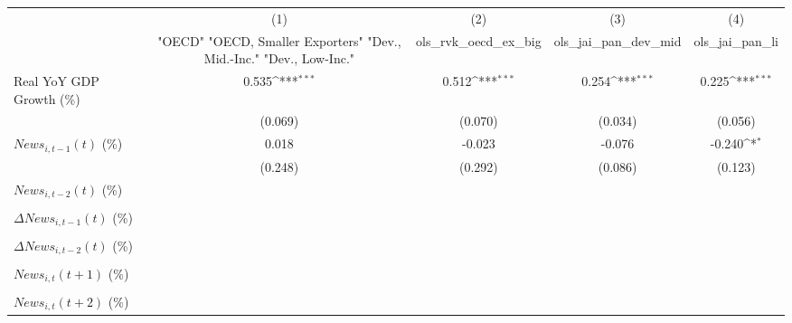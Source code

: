 {
\def\sym#1{\ifmmode^{#1}\else\(^{#1}\)\fi}
\begin{tabular}{l*{4}{c}}
\toprule
                    &\multicolumn{1}{c}{(1)}&\multicolumn{1}{c}{(2)}&\multicolumn{1}{c}{(3)}&\multicolumn{1}{c}{(4)}\\
                    &\multicolumn{1}{c}{ "OECD" "OECD, Smaller Exporters" "Dev., Mid.-Inc." "Dev., Low-Inc."}&\multicolumn{1}{c}{ols_rvk_oecd_ex_big}&\multicolumn{1}{c}{ols_jai_pan_dev_mid}&\multicolumn{1}{c}{ols_jai_pan_li}\\
\midrule
Real YoY GDP Growth (\%)&       0.535\sym{***}&       0.512\sym{***}&       0.254\sym{***}&       0.225\sym{***}\\
                    &     (0.069)         &     (0.070)         &     (0.034)         &     (0.056)         \\
\addlinespace
$ News_{i,t-1}(t)$ (\%)&       0.018         &      -0.023         &      -0.076         &      -0.240\sym{*}  \\
                    &     (0.248)         &     (0.292)         &     (0.086)         &     (0.123)         \\
\addlinespace
$ News_{i,t-2}(t)$ (\%)&                     &                     &                     &                     \\
                    &                     &                     &                     &                     \\
\addlinespace
$ \Delta News_{i,t-1}(t)$ (\%)&                     &                     &                     &                     \\
                    &                     &                     &                     &                     \\
\addlinespace
$ \Delta News_{i,t-2}(t)$ (\%)&                     &                     &                     &                     \\
                    &                     &                     &                     &                     \\
\addlinespace
$ News_{i,t}(t+1)$ (\%)&                     &                     &                     &                     \\
                    &                     &                     &                     &                     \\
\addlinespace
$ News_{i,t}(t+2)$ (\%)&                     &                     &                     &                     \\

\end{tabular}}
